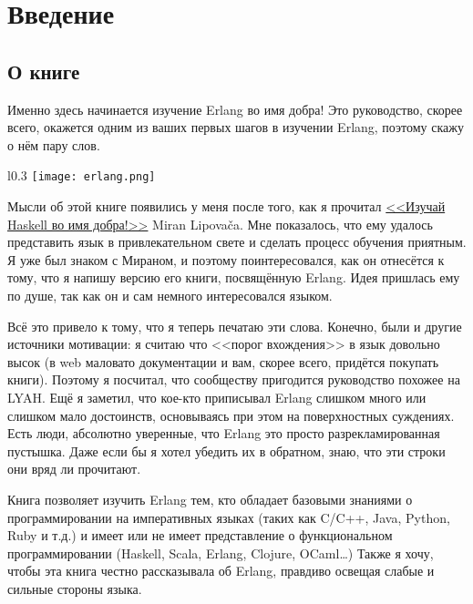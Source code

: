 \chapter{Введение}
\label{introduction}
\section{О книге}
\label{about-this-tutorial}

Именно здесь начинается изучение Erlang во имя добра!
Это руководство, скорее всего, окажется одним из ваших первых шагов в изучении Erlang, поэтому скажу о нём пару слов.

\begin{wrapfigure}{l}{0.3\linewidth}
    \texttt{[image: erlang.png]}
\end{wrapfigure}

Мысли об этой книге появились у меня после того, как я прочитал \href{http://learnyouahaskell.com}{<<Изучай Haskell во имя добра!>>} Miran Lipova\v{c}a.
Мне показалось, что ему удалось представить язык в привлекательном свете и сделать процесс обучения приятным.
Я уже был знаком с Мираном, и поэтому поинтересовался, как он отнесётся к тому, что я напишу версию его книги, посвящённую Erlang.
Идея пришлась ему по душе, так как он и сам немного интересовался языком.

Всё это привело к тому, что я теперь печатаю эти слова.
Конечно, были и другие источники мотивации: я считаю что <<порог вхождения>> в язык довольно высок (в web маловато документации и вам, скорее всего, придётся покупать книги).
Поэтому я посчитал, что сообществу пригодится руководство похожее на LYAH.
Ещё я заметил, что кое\--кто приписывал Erlang слишком много или слишком мало достоинств, основываясь при этом на поверхностных суждениях.
Есть люди, абсолютно уверенные, что Erlang это просто разрекламированная пустышка.
Даже если бы я хотел убедить их в обратном, знаю, что эти строки они вряд ли прочитают.

Книга позволяет изучить Erlang тем, кто обладает базовыми знаниями о программировании на императивных языках (таких как C/C++, Java, Python, Ruby и т.д.) и имеет или не имеет представление о функциональном программировании (Haskell, Scala, Erlang, Clojure, OCaml\ldots)
Также я хочу, чтобы эта книга честно рассказывала об Erlang, правдиво освещая слабые и сильные стороны языка.

